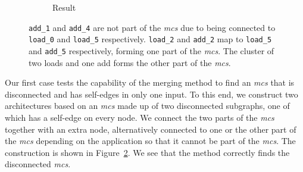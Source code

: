 \begin{figure}[!htb]
\begin{subfigure}[t]{0.33\textwidth}
    \caption{Result}
    \label{fig:multimcs:c}
  \end{subfigure}
\caption{\texttt{add\_1} and \texttt{add\_4} are not part of the \textit{mcs} due to being connected to \texttt{load\_0} and \texttt{load\_5} respectively. \texttt{load\_2} and \texttt{add\_2} map to \texttt{load\_5} and \texttt{add\_5} respectively, forming one part of the \textit{mcs}. The cluster of two loads and one add forms the other part of the \textit{mcs}.}
\label{fig:multimcs}
\end{figure}

Our first case tests the capability of the merging method to find an \textit{mcs} that is disconnected and has self-edges in only one input. To this end, we construct two architectures based on an \textit{mcs} made up of two disconnected subgraphs, one of which has a self-edge on every node. We connect the two parts of the \textit{mcs} together with an extra node, alternatively connected to one or the other part of the \textit{mcs} depending on the application so that it cannot be part of the \textit{mcs}. The construction is shown in Figure~\ref{fig:multimcs}. We see that the method correctly finds the disconnected \textit{mcs}.

